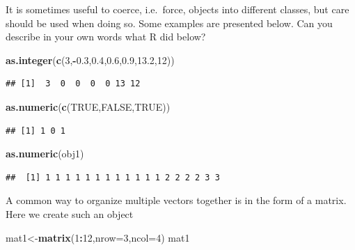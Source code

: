 \documentclass[
]{article}
\newenvironment{Shaded}{\begin{snugshade}}{\end{snugshade}}
\newcommand{\AttributeTok}[1]{\textcolor[rgb]{0.13,0.29,0.53}{#1}}
\newcommand{\ConstantTok}[1]{\textcolor[rgb]{0.56,0.35,0.01}{#1}}
\newcommand{\DecValTok}[1]{\textcolor[rgb]{0.00,0.00,0.81}{#1}}
\newcommand{\FloatTok}[1]{\textcolor[rgb]{0.00,0.00,0.81}{#1}}
\newcommand{\FunctionTok}[1]{\textcolor[rgb]{0.13,0.29,0.53}{\textbf{#1}}}
\newcommand{\NormalTok}[1]{#1}
\newcommand{\OtherTok}[1]{\textcolor[rgb]{0.56,0.35,0.01}{#1}}
\newcommand{\SpecialCharTok}[1]{\textcolor[rgb]{0.81,0.36,0.00}{\textbf{#1}}}
\begin{document}
It is sometimes useful to coerce, i.e.~force, objects into different
classes, but care should be used when doing so. Some examples are
presented below. Can you describe in your own words what R did below?

\begin{Shaded}
\begin{Highlighting}[]
\FunctionTok{as.integer}\NormalTok{(}\FunctionTok{c}\NormalTok{(}\DecValTok{3}\NormalTok{,}\SpecialCharTok{{-}}\FloatTok{0.3}\NormalTok{,}\FloatTok{0.4}\NormalTok{,}\FloatTok{0.6}\NormalTok{,}\FloatTok{0.9}\NormalTok{,}\FloatTok{13.2}\NormalTok{,}\DecValTok{12}\NormalTok{))}
\end{Highlighting}
\end{Shaded}

\begin{verbatim}
## [1]  3  0  0  0  0 13 12
\end{verbatim}

\begin{Shaded}
\begin{Highlighting}[]
\FunctionTok{as.numeric}\NormalTok{(}\FunctionTok{c}\NormalTok{(}\ConstantTok{TRUE}\NormalTok{,}\ConstantTok{FALSE}\NormalTok{,}\ConstantTok{TRUE}\NormalTok{))}
\end{Highlighting}
\end{Shaded}

\begin{verbatim}
## [1] 1 0 1
\end{verbatim}

\begin{Shaded}
\begin{Highlighting}[]
\FunctionTok{as.numeric}\NormalTok{(obj1)}
\end{Highlighting}
\end{Shaded}

\begin{verbatim}
##  [1] 1 1 1 1 1 1 1 1 1 1 1 1 2 2 2 2 3 3
\end{verbatim}

A common way to organize multiple vectors together is in the form of a
matrix. Here we create such an object

\begin{Shaded}
\begin{Highlighting}[]
\NormalTok{mat1}\OtherTok{\textless{}{-}}\FunctionTok{matrix}\NormalTok{(}\DecValTok{1}\SpecialCharTok{:}\DecValTok{12}\NormalTok{,}\AttributeTok{nrow=}\DecValTok{3}\NormalTok{,}\AttributeTok{ncol=}\DecValTok{4}\NormalTok{)}
\NormalTok{mat1}
\end{Highlighting}
\end{Shaded}
\end{document}
